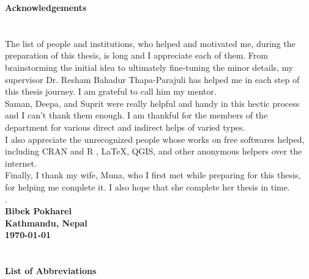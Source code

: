 \newpage
\begin{center}
\textbf{\large Acknowledgements}
\end{center}
\section*{}

\vspace{-10mm} 
The list of people and institutions, who helped and motivated me, during the preparation of this thesis, is long and  I appreciate each of them. From brainstorming the initial idea to ultimately fine-tuning the minor details, my supervisor Dr. Resham Bahadur Thapa-Parajuli has helped me in each step of this thesis journey. I am grateful to call him my mentor. \\
Saman, Deepa, and Suprit were really helpful and handy in this hectic process and I can't thank them enough. I am thankful for the members of the department for various direct and indirect helps of varied types.\\
I also appreciate the unrecognized people whose works on free softwares helped, including CRAN and R , \LaTeX{}, QGIS, and other anonymous helpers over the internet.\\
Finally, I thank my wife, Muna, who I first met while preparing for this thesis, for helping me complete it. I also hope that she complete her thesis in time.\\
.\vspace{5mm}\\ 
\textbf{Bibek Pokharel}\\
\textbf{Kathmandu, Nepal}\\
\textbf{\today}

\newpage
\begin{center}
\tableofcontents
\end{center}

\newpage
\begin{center}
\listoftables

\section*{}

\newpage
\listoffigures
\section*{}


\newpage
\textbf{\large List of Abbreviations}
\end{center}
